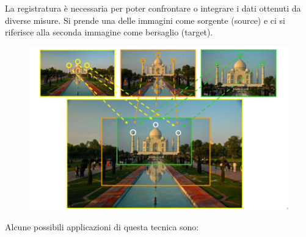 La registratura è necessaria per poter confrontare o integrare i dati ottenuti da diverse misure. Si prende una delle immagini come sorgente (source) e ci si
riferisce alla seconda immagine come bersaglio (target).

\begin{figure}[H]
    \centering
    \includegraphics[width=\linewidth, keepaspectratio]{capitoli/immagini/imgs/image-registration.png}
\end{figure}

Alcune possibili applicazioni di questa tecnica sono:

